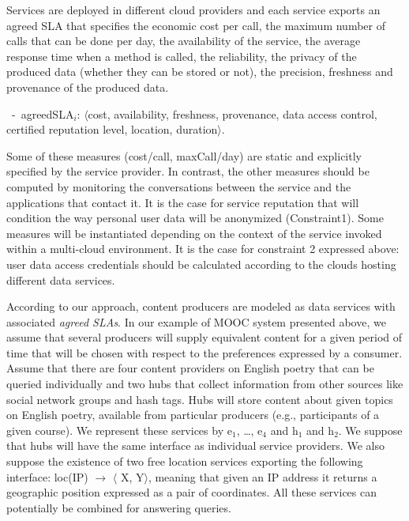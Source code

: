 Services are deployed in different cloud providers and each service exports an agreed SLA that specifies the economic cost per call, the maximum number of calls that can be done per day, the availability of the service, the average response time when a method is called, the reliability, the privacy of the produced data (whether they can be stored or not), the precision, freshness and provenance of the produced data. 


\begin{trivlist}\sf\footnotesize
\item[~-~agreedSLA$_i$:] $\langle$cost, availability, freshness, provenance, data access control, certified reputation level, location, duration$\rangle$. 
 \end{trivlist}
 
Some of these measures ({\sf cost/call, maxCall/day}) are static and explicitly specified by the service provider. 
In contrast, the other measures should be computed by monitoring the conversations between the service and the applications that contact it.  It is the case for service reputation that will condition the way personal user data will be anonymized (Constraint1).  Some measures will be instantiated depending on the context of  the service invoked within a multi-cloud environment. It is the case for constraint 2 expressed above:   user data access credentials should be calculated according to the clouds hosting different data services.


According to our approach, content producers are modeled as data services with associated \textit{agreed SLAs}. 
In our example of MOOC system presented above, we assume that several producers will supply equivalent content for a given period of time  that will be chosen with respect to the  preferences expressed by a consumer. 
Assume that there are four content providers on English poetry that can be queried individually and two hubs that collect information from other sources like social network groups and hash tags.
Hubs will store content about given topics on  English poetry, available from particular producers (e.g., participants of a given course).
We represent these services by {\sf e$_1$, \dots, e$_4$} and {\sf h$_1$} and {\sf h$_2$}. We suppose that hubs will have the same interface as individual service providers.
We also suppose the existence of two free location services exporting the following interface: {\sf loc(IP) $\rightarrow$ $\langle$ X, Y$\rangle$}, meaning that given an IP address it returns a geographic position expressed as a pair of coordinates. 
All these services can potentially be combined for answering queries.

